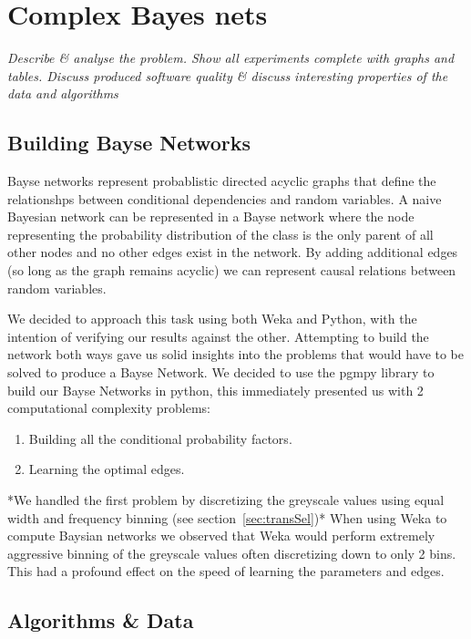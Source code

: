 \documentclass[11pt]{article}
\begin{document}
\pagebreak

\section{Complex Bayes nets}
\par
\emph{Describe \& analyse the problem. Show all experiments complete with graphs and tables. Discuss produced software quality \& discuss interesting properties of the data and algorithms}

\subsection{Building Bayse Networks}
Bayse networks represent probablistic directed acyclic graphs that define the relationshps between conditional dependencies and random variables.
A naive Bayesian network can be represented in a Bayse network where the node representing the probability distribution of the class is the only parent of all other nodes and no other edges exist in the network. 
By adding additional edges (so long as the graph remains acyclic) we can represent causal relations between random variables.
\par
We decided to approach this task using both Weka and Python, with the intention of verifying our results against the other.
Attempting to build the network both ways gave us solid insights into the problems that would have to be solved to produce a Bayse Network.
We decided to use the pgmpy library to build our Bayse Networks in python, this immediately presented us with 2 computational complexity problems:
\begin{enumerate}
    \item Building all the conditional probability factors.
    \item Learning the optimal edges.
\end{enumerate}

*We handled the first problem by discretizing the greyscale values using equal width and frequency binning (see section~\ref{sec:transSel})*
When using Weka to compute Baysian networks we observed that Weka would perform extremely aggressive binning of the greyscale values often discretizing down to only 2 bins. This had a profound effect on the speed of learning the parameters and edges.

\subsection{Algorithms \& Data}
\end{document}
